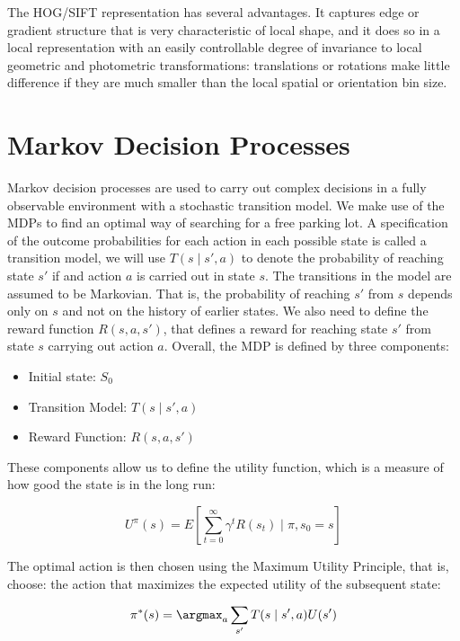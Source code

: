 The HOG/SIFT representation has several advantages. It captures edge or
gradient structure that is very characteristic of local shape, and it does
so in a local representation with an easily controllable degree of
invariance to local geometric and photometric transformations:
translations or rotations make little difference if they are much smaller
than the local spatial or orientation bin size.


\section{Markov Decision Processes}
\label{sec:markov_descision_processes}
Markov decision processes are used to carry out complex decisions in a fully
observable environment with a stochastic transition model. We make use of the
MDPs to find an optimal way of searching for a free parking lot.  A
specification of the outcome probabilities for each action in each possible
state is called a transition model, we will use $T(s \mid s', a)$ to denote
the probability of reaching state $s'$ if and action $a$ is carried out in
state $s$. The transitions in the model are assumed to be Markovian. That is,
the probability of reaching $s'$ from $s$ depends only on $s$ and not on the
history of earlier states. We also need to define the reward function $R(s, a,
s')$, that defines a reward for reaching state $s'$ from state $s$ carrying
out action $a$. Overall, the MDP is defined by three components:

\begin{itemize}
    \item Initial state: $S_0$
    \item Transition Model: $T(s \mid s', a)$
    \item Reward Function: $R(s, a, s')$
\end{itemize}

These components allow us to define the utility function, which is a measure
of how good the state is in the long run:

\begin{equation}
U^{\pi}(s) = E\left[\sum_{t=0}^{\infty} \gamma^t R(s_t) \mid \pi,s_0 = s \right]
\end{equation}

The optimal action is then chosen using the Maximum Utility Principle, that
is, choose: the action that maximizes the expected utility of the subsequent
state:

\begin{equation}
\label{lbl:optimal_policy}
\pi^*(s) = \argmax_a \sum_{s'} T(s \mid s', a)U(s')
\end{equation}

